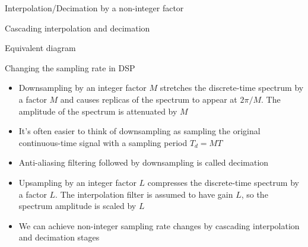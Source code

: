 \documentclass[10pt]{beamer}
\begin{document}
\begin{frame}{Interpolation/Decimation by a non-integer factor}

\begin{block}{Cascading interpolation and decimation}
	\vspace{-0.5cm}
	\begin{center}
		\resizebox{\linewidth}{!}{}
	\end{center}
\end{block}
\vspace{-0.5cm}
\begin{block}{Equivalent diagram}
	\begin{center}
		\resizebox{0.8\linewidth}{!}{}
	\end{center}
\end{block}
\end{frame}

%
\begin{frame}{Changing the sampling rate in DSP}
\begin{itemize}
	\item Downsampling by an integer factor $M$ stretches the discrete-time spectrum by a factor $M$ and causes replicas of the spectrum to appear at $2\pi/M$. The amplitude of the spectrum is attenuated by $M$
	\item It's often easier to think of downsampling as sampling the original continuous-time signal with a sampling period $T_d = MT$
	\item Anti-aliasing filtering followed by downsampling is called decimation
	\item Upsampling by an integer factor $L$ compresses the discrete-time spectrum by a factor $L$. The interpolation filter is assumed to have gain $L$, so the spectrum amplitude is scaled by $L$
	\item We can achieve non-integer sampling rate changes by cascading interpolation and decimation stages
\end{itemize}
\end{frame}

%
\end{document}
